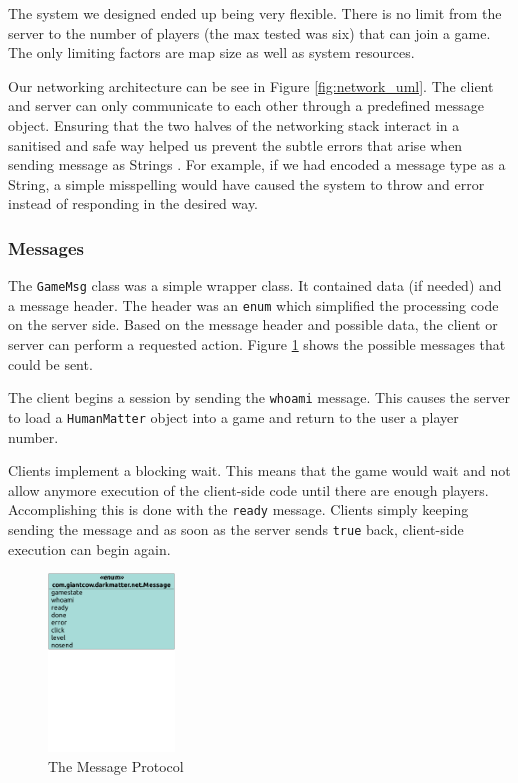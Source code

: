The system we designed ended up being very flexible. There is no limit
from the server to the number of players (the max tested was six) that
can join a game. The only limiting factors are map size as well as
system resources.

Our networking architecture can be see in Figure
\ref{fig:network_uml}. The client and server can only communicate to
each other through a predefined message object. Ensuring that the two
halves of the networking stack interact in a sanitised and safe way
helped us prevent the subtle errors that arise when sending message as
Strings \cite{bloch2008}. For example, if we had encoded a message
type as a String, a simple misspelling would have caused the system to
throw and error instead of responding in the desired way.


\subsubsection{Messages}

The \texttt{GameMsg} class was a simple wrapper class. It contained
data (if needed) and a message header. The header was an \texttt{enum}
which simplified the processing code on the server side. Based on the
message header and possible data, the client or server can perform a
requested action. Figure \ref{fig:message} shows the possible
messages that could be sent.

The client begins a session by sending the \texttt{whoami}
message. This causes the server to load a \texttt{HumanMatter} object
into a game and return to the user a player number.

Clients implement a blocking wait. This means that the game would wait
and not allow anymore execution of the client-side code until there
are enough players. Accomplishing this is done with the \texttt{ready}
message. Clients simply keeping sending the message and as soon as the
server sends \texttt{true} back, client-side execution can begin
again.

\begin{figure}
  \centering
  \includegraphics[width=0.3\textwidth,trim= 0 8cm 0 0]{img/message.pdf}
  \caption{The Message Protocol}
  \label{fig:message}
\end{figure}

